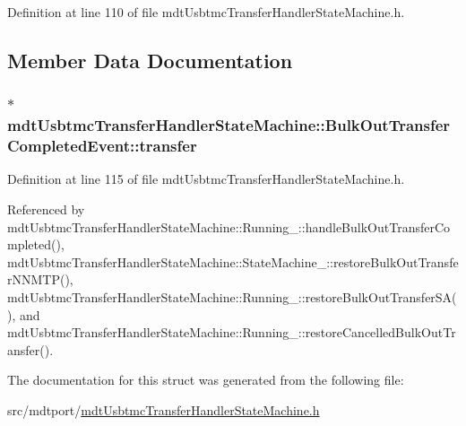 Definition at line 110 of file mdt\-Usbtmc\-Transfer\-Handler\-State\-Machine.\-h.



\subsection{Member Data Documentation}
\hypertarget{structmdt_usbtmc_transfer_handler_state_machine_1_1_bulk_out_transfer_completed_event_ac7bfcdbdf4e8af849006cff1cb9c58e7}{
\subsubsection[{transfer}]{$\ast$ mdt\-Usbtmc\-Transfer\-Handler\-State\-Machine\-::\-Bulk\-Out\-Transfer\-Completed\-Event\-::transfer}}\label{structmdt_usbtmc_transfer_handler_state_machine_1_1_bulk_out_transfer_completed_event_ac7bfcdbdf4e8af849006cff1cb9c58e7}


Definition at line 115 of file mdt\-Usbtmc\-Transfer\-Handler\-State\-Machine.\-h.



Referenced by mdt\-Usbtmc\-Transfer\-Handler\-State\-Machine\-::\-Running\-\_\-\-::handle\-Bulk\-Out\-Transfer\-Completed(), mdt\-Usbtmc\-Transfer\-Handler\-State\-Machine\-::\-State\-Machine\-\_\-\-::restore\-Bulk\-Out\-Transfer\-N\-N\-M\-T\-P(), mdt\-Usbtmc\-Transfer\-Handler\-State\-Machine\-::\-Running\-\_\-\-::restore\-Bulk\-Out\-Transfer\-S\-A(), and mdt\-Usbtmc\-Transfer\-Handler\-State\-Machine\-::\-Running\-\_\-\-::restore\-Cancelled\-Bulk\-Out\-Transfer().



The documentation for this struct was generated from the following file\-:\begin{DoxyCompactItemize}
\item 
src/mdtport/\hyperlink{mdt_usbtmc_transfer_handler_state_machine_8h}{mdt\-Usbtmc\-Transfer\-Handler\-State\-Machine.\-h}\end{DoxyCompactItemize}
